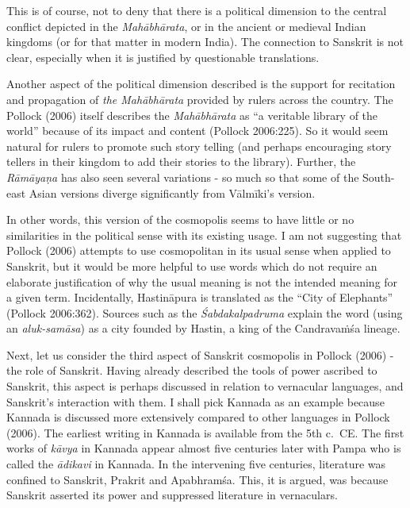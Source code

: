 This is of course, not to deny that there is a political dimension to the central conflict depicted in the {\sl Mahābhārata}, or in the ancient or medieval Indian kingdoms (or for that matter in modern India). The connection to Sanskrit is not clear, especially when it is justified by questionable translations.

Another aspect of the political dimension described is the support for recitation and propagation of {\sl the Mahābhārata} provided by rulers across the country. The Pollock (2006) itself describes the {\sl Mahābhārata} as “a veritable library of the world” because of its impact and content (Pollock 2006:225). So it would seem natural for rulers to promote such story telling (and perhaps encouraging story tellers in their kingdom to add their stories to the library).  Further, the {\sl Rāmāyaṇa} has also seen several variations - so much so that some of the South-east Asian versions diverge significantly from Vālmīki’s version. 

In other words, this version of the cosmopolis seems to have little or no similarities in the political sense with its existing usage. I am not suggesting that Pollock (2006) attempts to use cosmopolitan in its usual sense when applied to Sanskrit, but it would be more helpful to use words which do not require an elaborate justification of why the usual meaning is not the intended meaning for a given term. Incidentally, Hastināpura is translated as the “City of Elephants” (Pollock 2006:362). Sources such as the {\sl Śabdakalpadruma} explain the word (using an {\sl aluk-samāsa}) as a city founded by Hastin, a king of the Candravaṁśa  lineage.

Next, let us consider the third aspect of Sanskrit cosmopolis in Pollock (2006) - the role of Sanskrit. Having already described the tools of power ascribed to Sanskrit, this aspect is perhaps discussed in relation to vernacular languages, and Sanskrit’s interaction with them. I shall pick Kannada as an example because Kannada is discussed more extensively compared to other languages in Pollock (2006). The earliest writing in Kannada is available from the 5th c.\ CE\@. The first works of {\sl kāvya} in Kannada appear almost five centuries later with Pampa who is called the {\sl ādikavi} in Kannada. In the intervening five centuries, literature was confined to Sanskrit, Prakrit and Apabhramśa. This, it is argued, was because Sanskrit asserted its power and suppressed literature in vernaculars.

